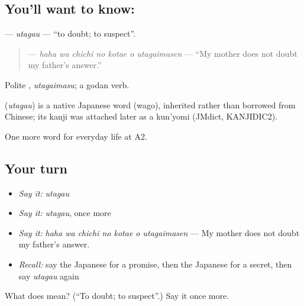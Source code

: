 \subsection*{You'll want to know: }
\textbf{} — \emph{utagau} — \textquotedblleft{}to doubt; to suspect\textquotedblright{}.

\begin{quote}
\textbf{   } — \emph{haha wa chichi no kotae o utagaimasen} — \textquotedblleft{}My mother does not doubt my father's answer.\textquotedblright{}
\end{quote}

Polite \textbf{}, \emph{utagaimasu}; a godan verb.

\begin{cousinweb}
\textbf{} (\emph{utagau}) is a native Japanese word (wago), inherited rather than borrowed from Chinese; its kanji was attached later as a kun'yomi (JMdict, KANJIDIC2).
\end{cousinweb}

\begin{grammarlens}[title={What you've built}]
One more word for everyday life at A2.
\end{grammarlens}

\subsection*{Your turn}
\begin{itemize}
\raggedright
  \item \emph{Say it:} \emph{utagau}
  \item \emph{Say it:} \emph{utagau}, once more
  \item \emph{Say it:} \emph{haha wa chichi no kotae o utagaimasen} — My mother does not doubt my father's answer.
  \item \emph{Recall:} say the Japanese for a promise, then the Japanese for a secret, then say \emph{utagau} again
\end{itemize}

\begin{tcolorbox}[breakable,colback=teal!4,colframe=teal!35!black,title={Before you move on}]
What does  mean? (\textquotedblleft{}To doubt; to suspect\textquotedblright{}.) Say it once more.
\end{tcolorbox}

